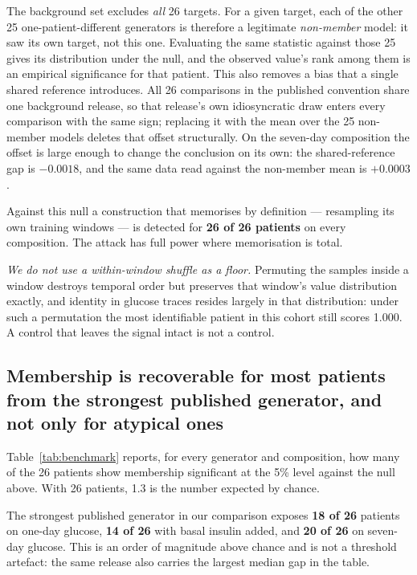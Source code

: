 \documentclass[pdflatex,sn-nature]{sn-jnl}
\theoremstyle{thmstyleone}
\begin{document}
The background set excludes \emph{all} 26 targets. For a given target, each of
the other 25 one-patient-different generators is therefore a legitimate
\emph{non-member} model: it saw its own target, not this one. Evaluating the
same statistic against those 25 gives its distribution under the null, and the
observed value's rank among them is an empirical significance for that patient.
This also removes a bias that a single shared reference introduces. All 26
comparisons in the published convention share one background release, so that
release's own idiosyncratic draw enters every comparison with the same sign;
replacing it with the mean over the 25 non-member models deletes that offset
structurally. On the seven-day composition the offset is large enough to change
the conclusion on its own: the shared-reference gap is $-0.0018$, and the same
data read against the non-member mean is $+0.0003$.

Against this null a construction that memorises by definition --- resampling its
own training windows --- is detected for \textbf{26 of 26 patients} on every
composition. The attack has full power where memorisation is total.

\emph{We do not use a within-window shuffle as a floor.} Permuting the samples
inside a window destroys temporal order but preserves that window's value
distribution exactly, and identity in glucose traces resides largely in that
distribution: under such a permutation the most identifiable patient in this
cohort still scores 1.000. A control that leaves the signal intact is not a
control.

\subsection{Membership is recoverable for most patients from the strongest
published generator, and not only for atypical ones}\label{subsec:concentration}

Table~\ref{tab:benchmark} reports, for every generator and composition, how
many of the 26 patients show membership significant at the 5\% level against
the null above. With 26 patients, 1.3 is the number expected by chance.

The strongest published generator in our comparison exposes \textbf{18 of 26}
patients on one-day glucose, \textbf{14 of 26} with basal insulin added, and
\textbf{20 of 26} on seven-day glucose. This is an order of magnitude above
chance and is not a threshold artefact: the same release also carries the
largest median gap in the table.
\end{document}
